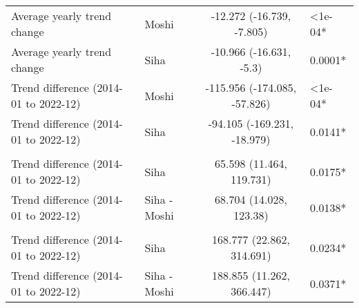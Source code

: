 \begin{longtable}{l|lcl}
\midrule\addlinespace[2.5pt]
\multicolumn{4}{l}{Malnutrition} \\ 
\midrule\addlinespace[2.5pt]
Average yearly trend change & Moshi & -12.272 (-16.739, -7.805) & <1e-04* \\ 
Average yearly trend change & Siha & -10.966 (-16.631, -5.3) & 0.0001* \\ 
Trend difference (2014-01 to 2022-12) & Moshi & -115.956 (-174.085, -57.826) & <1e-04* \\ 
Trend difference (2014-01 to 2022-12) & Siha & -94.105 (-169.231, -18.979) & 0.0141* \\ 
\midrule\addlinespace[2.5pt]
\multicolumn{4}{l}{Cancer} \\ 
\midrule\addlinespace[2.5pt]
Trend difference (2014-01 to 2022-12) & Siha & 65.598 (11.464, 119.731) & 0.0175* \\ 
Trend difference (2014-01 to 2022-12) & Siha - Moshi & 68.704 (14.028, 123.38) & 0.0138* \\ 
\midrule\addlinespace[2.5pt]
\multicolumn{4}{l}{Other Non-Communicable} \\ 
\midrule\addlinespace[2.5pt]
Trend difference (2014-01 to 2022-12) & Siha & 168.777 (22.862, 314.691) & 0.0234* \\ 
Trend difference (2014-01 to 2022-12) & Siha - Moshi & 188.855 (11.262, 366.447) & 0.0371* \\ 
\bottomrule
\end{longtable}

